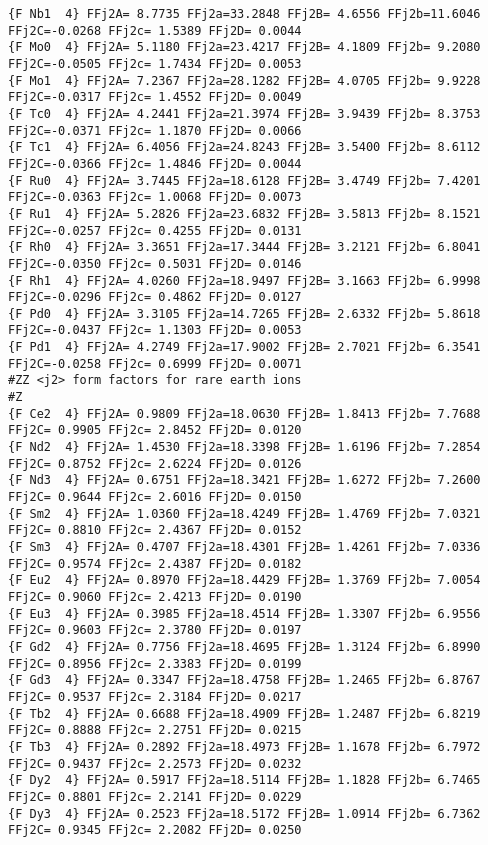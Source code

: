 {\begin{verbatim}
{F Nb1  4} FFj2A= 8.7735 FFj2a=33.2848 FFj2B= 4.6556 FFj2b=11.6046 FFj2C=-0.0268 FFj2c= 1.5389 FFj2D= 0.0044 
{F Mo0  4} FFj2A= 5.1180 FFj2a=23.4217 FFj2B= 4.1809 FFj2b= 9.2080 FFj2C=-0.0505 FFj2c= 1.7434 FFj2D= 0.0053 
{F Mo1  4} FFj2A= 7.2367 FFj2a=28.1282 FFj2B= 4.0705 FFj2b= 9.9228 FFj2C=-0.0317 FFj2c= 1.4552 FFj2D= 0.0049 
{F Tc0  4} FFj2A= 4.2441 FFj2a=21.3974 FFj2B= 3.9439 FFj2b= 8.3753 FFj2C=-0.0371 FFj2c= 1.1870 FFj2D= 0.0066 
{F Tc1  4} FFj2A= 6.4056 FFj2a=24.8243 FFj2B= 3.5400 FFj2b= 8.6112 FFj2C=-0.0366 FFj2c= 1.4846 FFj2D= 0.0044 
{F Ru0  4} FFj2A= 3.7445 FFj2a=18.6128 FFj2B= 3.4749 FFj2b= 7.4201 FFj2C=-0.0363 FFj2c= 1.0068 FFj2D= 0.0073 
{F Ru1  4} FFj2A= 5.2826 FFj2a=23.6832 FFj2B= 3.5813 FFj2b= 8.1521 FFj2C=-0.0257 FFj2c= 0.4255 FFj2D= 0.0131 
{F Rh0  4} FFj2A= 3.3651 FFj2a=17.3444 FFj2B= 3.2121 FFj2b= 6.8041 FFj2C=-0.0350 FFj2c= 0.5031 FFj2D= 0.0146 
{F Rh1  4} FFj2A= 4.0260 FFj2a=18.9497 FFj2B= 3.1663 FFj2b= 6.9998 FFj2C=-0.0296 FFj2c= 0.4862 FFj2D= 0.0127 
{F Pd0  4} FFj2A= 3.3105 FFj2a=14.7265 FFj2B= 2.6332 FFj2b= 5.8618 FFj2C=-0.0437 FFj2c= 1.1303 FFj2D= 0.0053 
{F Pd1  4} FFj2A= 4.2749 FFj2a=17.9002 FFj2B= 2.7021 FFj2b= 6.3541 FFj2C=-0.0258 FFj2c= 0.6999 FFj2D= 0.0071 
#ZZ <j2> form factors for rare earth ions
#Z
{F Ce2  4} FFj2A= 0.9809 FFj2a=18.0630 FFj2B= 1.8413 FFj2b= 7.7688 FFj2C= 0.9905 FFj2c= 2.8452 FFj2D= 0.0120 
{F Nd2  4} FFj2A= 1.4530 FFj2a=18.3398 FFj2B= 1.6196 FFj2b= 7.2854 FFj2C= 0.8752 FFj2c= 2.6224 FFj2D= 0.0126 
{F Nd3  4} FFj2A= 0.6751 FFj2a=18.3421 FFj2B= 1.6272 FFj2b= 7.2600 FFj2C= 0.9644 FFj2c= 2.6016 FFj2D= 0.0150 
{F Sm2  4} FFj2A= 1.0360 FFj2a=18.4249 FFj2B= 1.4769 FFj2b= 7.0321 FFj2C= 0.8810 FFj2c= 2.4367 FFj2D= 0.0152 
{F Sm3  4} FFj2A= 0.4707 FFj2a=18.4301 FFj2B= 1.4261 FFj2b= 7.0336 FFj2C= 0.9574 FFj2c= 2.4387 FFj2D= 0.0182 
{F Eu2  4} FFj2A= 0.8970 FFj2a=18.4429 FFj2B= 1.3769 FFj2b= 7.0054 FFj2C= 0.9060 FFj2c= 2.4213 FFj2D= 0.0190 
{F Eu3  4} FFj2A= 0.3985 FFj2a=18.4514 FFj2B= 1.3307 FFj2b= 6.9556 FFj2C= 0.9603 FFj2c= 2.3780 FFj2D= 0.0197 
{F Gd2  4} FFj2A= 0.7756 FFj2a=18.4695 FFj2B= 1.3124 FFj2b= 6.8990 FFj2C= 0.8956 FFj2c= 2.3383 FFj2D= 0.0199 
{F Gd3  4} FFj2A= 0.3347 FFj2a=18.4758 FFj2B= 1.2465 FFj2b= 6.8767 FFj2C= 0.9537 FFj2c= 2.3184 FFj2D= 0.0217 
{F Tb2  4} FFj2A= 0.6688 FFj2a=18.4909 FFj2B= 1.2487 FFj2b= 6.8219 FFj2C= 0.8888 FFj2c= 2.2751 FFj2D= 0.0215 
{F Tb3  4} FFj2A= 0.2892 FFj2a=18.4973 FFj2B= 1.1678 FFj2b= 6.7972 FFj2C= 0.9437 FFj2c= 2.2573 FFj2D= 0.0232 
{F Dy2  4} FFj2A= 0.5917 FFj2a=18.5114 FFj2B= 1.1828 FFj2b= 6.7465 FFj2C= 0.8801 FFj2c= 2.2141 FFj2D= 0.0229 
{F Dy3  4} FFj2A= 0.2523 FFj2a=18.5172 FFj2B= 1.0914 FFj2b= 6.7362 FFj2C= 0.9345 FFj2c= 2.2082 FFj2D= 0.0250 

\end{verbatim}}
